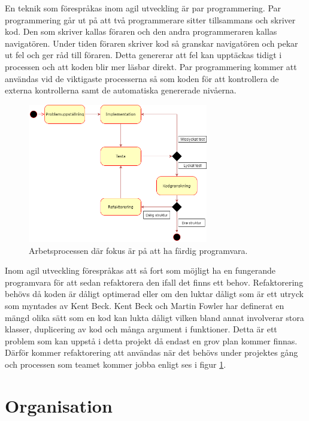 \documentclass[a4paper,12pt,oneside,final]{extbook}
\begin{document}
En teknik som förespråkas inom agil utveckling är par programmering\cite{Sewell2012asd}. Par programmering går ut på att två programmerare sitter tillsammans och skriver kod. Den som skriver kallas föraren och den andra programmeraren kallas navigatören. Under tiden föraren skriver kod så granskar navigatören och pekar ut fel och ger råd till föraren. Detta genererar att fel kan upptäckas tidigt i processen och att koden blir mer läsbar direkt. Par programmering kommer att användas vid de viktigaste processerna så som koden för att kontrollera de externa kontrollerna samt de automatiska genererade nivåerna. 

\begin{figure}[h]
	\includegraphics[width=0.7\textwidth, center]{agil.png}
	\caption{Arbetsprocessen där fokus är på att ha färdig programvara.}
	\label{fig:refaktorering}
\end{figure}

Inom agil utveckling förespråkas att så fort som möjligt ha en fungerande programvara för att sedan refaktorera den ifall det finns ett behov. Refaktorering behövs då koden är dåligt optimerad eller om den luktar dåligt som är ett utryck som myntades av Kent Beck\cite{Fowler2000rit}. Kent Beck och Martin Fowler har definerat en mängd olika sätt som en kod kan lukta dåligt vilken bland annat involverar stora klasser, duplicering av kod och många argument i funktioner\cite{Fowler2000rit}. Detta är ett problem som kan uppstå i detta projekt då endast en grov plan kommer finnas. Därför kommer refaktorering att användas när det behövs under projektes gång och processen som teamet kommer jobba enligt ses i figur \ref{fig:refaktorering}.





\section{Organisation}
\end{document}
